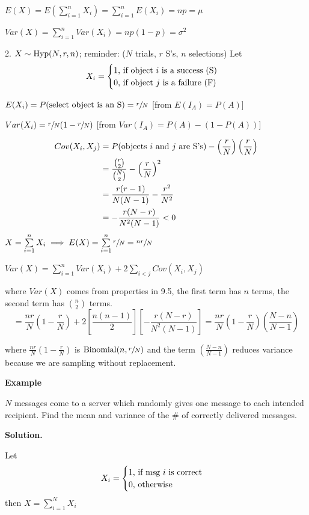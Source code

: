 $ E(X)=E(\sum\limits_{i=1}^{n} X_i)=\sum\limits_{i=1}^{n} E(X_i)=np=\mu $

$ Var(X)=\sum\limits_{i=1}^{n} Var(X_i)=np(1-p)=\sigma^2 $

2. $ X \sim \operatorname{Hyp}(N,r,n) $; reminder:
($ N $ trials, $ r $ S's, $ n $ selections)
Let
\[X_i=\begin{cases}
        1,\,\text{if object $ i $ is a success (S)} \\
        0,\,\text{if object $ j $ is a failure (F)}
    \end{cases} \]

$ E(X_i)=P(\text{select object is an S})=\sfrac{r}{N} $
[from $E(I_A)=P(A)$]

$ Var(X_i)=\sfrac{r}{N} (1-\sfrac{r}{N} ) $
[from $ Var(I_A)=P(A)-(1-P(A)) $]

\begin{align*}
    Cov(X_i,X_j)
     & =P(\text{objects $ i $ and $ j $ are S's})-
    \left(\frac{r}{N}\right)\left(\frac{r}{N}\right)                 \\
     & =\frac{\binom{r}{2}}{\binom{N}{2}}-\left(\frac{r}{N}\right)^2 \\
     & =\frac{r(r-1)}{N(N-1)} -\frac{r^2}{N^2}                       \\
     & =-\frac{r(N-r)}{N^2(N-1)}<0
\end{align*}
$ X=\sum\limits_{i=1}^{n} X_i\implies E(X)=\sum\limits_{i=1}^{n} \sfrac{r}{N} =
    \sfrac{nr}{N} $

$ Var(X)=\sum\limits_{i=1}^{n} Var(X_i)+2 \sum\limits_{i<j} Cov(X_i,X_j)  $

where $ Var(X) $ comes from properties in 9.5, the first term has $ n $ terms,
the second term has $ \binom{n}{2} $ terms.
\[
    = \frac{nr}{N} \left(1-\frac{r}{N}\right)+2\left[\frac{n(n-1)}{2}\right]
    \left[-\frac{r(N-r)}{N^2(N-1)}\right]
    = \frac{nr}{N} \left(1-\frac{r}{N}\right)
    \left(\frac{N-n}{N-1}\right)
\]

where $ \frac{nr}{N} \left(1-\frac{r}{N}\right)$ is $\operatorname{Binomial}(n,\sfrac{r}{N}) $
and the term $ \left(\frac{N-n}{N-1}\right) $
reduces variance because we are sampling without replacement.

\textbf{Example}

$ N $ messages come to a server which randomly gives one message to each
intended recipient. Find the mean and variance of the \# of correctly delivered
messages.

\textbf{Solution.}

Let
\[ X_i=
    \begin{cases}
        1,\,\text{if msg $ i $ is correct} \\
        0,\,\text{otherwise}
    \end{cases} \]
then $ X=\sum\limits_{i=1}^{N}X_i $

